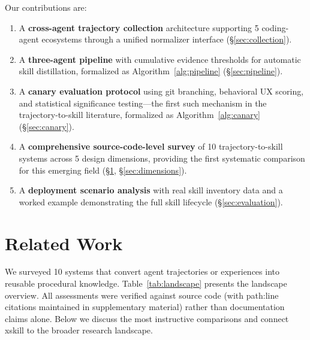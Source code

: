\documentclass{article}
\begin{document}
Our contributions are:
\begin{enumerate}
    \item A \textbf{cross-agent trajectory collection} architecture supporting 5 coding-agent ecosystems through a unified normalizer interface (\S\ref{sec:collection}).
    \item A \textbf{three-agent pipeline} with cumulative evidence thresholds for automatic skill distillation, formalized as Algorithm~\ref{alg:pipeline} (\S\ref{sec:pipeline}).
    \item A \textbf{canary evaluation protocol} using git branching, behavioral UX scoring, and statistical significance testing---the first such mechanism in the trajectory-to-skill literature, formalized as Algorithm~\ref{alg:canary} (\S\ref{sec:canary}).
    \item A \textbf{comprehensive source-code-level survey} of 10 trajectory-to-skill systems across 5 design dimensions, providing the first systematic comparison for this emerging field (\S\ref{sec:related}, \S\ref{sec:dimensions}).
    \item A \textbf{deployment scenario analysis} with real skill inventory data and a worked example demonstrating the full skill lifecycle (\S\ref{sec:evaluation}).
\end{enumerate}

\section{Related Work}
\label{sec:related}

We surveyed 10 systems that convert agent trajectories or experiences into reusable procedural knowledge. Table~\ref{tab:landscape} presents the landscape overview. All assessments were verified against source code (with path:line citations maintained in supplementary material) rather than documentation claims alone. Below we discuss the most instructive comparisons and connect xskill to the broader research landscape.
\end{document}
